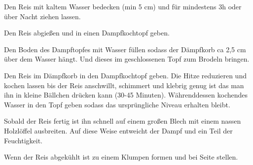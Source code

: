 \vspace*{\fill}
\begin{multicols}{2}

Den Reis mit kaltem Wasser bedecken (min 5 cm) und für mindestens 3h oder über Nacht ziehen lassen.

Den Reis abgießen und in einen Dampfkochtopf geben. 

Den Boden des Dampftopfes mit Wasser füllen sodass der Dämpfkorb ca 2,5 cm über dem Wasser hängt.
Und dieses im geschlossenen Topf zum Brodeln bringen.

Den Reis im Dämpfkorb in den Dampfkochtopf geben.
Die Hitze reduzieren und kochen lassen bis der Reis anschwillt, schimmert und klebrig genug ist 
das man ihn in kleine Bällchen drücken kann (30-45 Minuten).
Währenddessen kochendes Wasser in den Topf geben sodass das ursprüngliche Niveau erhalten bleibt.

Sobald der Reis fertig ist ihn schnell auf einem großen Blech mit einem nassen Holzlöffel
ausbreiten. Auf diese Weise entweicht der Dampf und ein Teil der Feuchtigkeit.

Wenn der Reis abgekühlt ist zu einem Klumpen formen und
bei Seite stellen.\\



\end{multicols}
